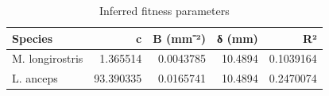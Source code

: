 \documentclass[]{article}
\newenvironment{Shaded}{\begin{snugshade}}{\end{snugshade}}
\newcommand{\DataTypeTok}[1]{\textcolor[rgb]{0.13,0.29,0.53}{#1}}
\newcommand{\KeywordTok}[1]{\textcolor[rgb]{0.13,0.29,0.53}{\textbf{#1}}}
\newcommand{\NormalTok}[1]{#1}
\newcommand{\OperatorTok}[1]{\textcolor[rgb]{0.81,0.36,0.00}{\textbf{#1}}}
\newcommand{\StringTok}[1]{\textcolor[rgb]{0.31,0.60,0.02}{#1}}
\begin{document}
\begin{Shaded}
\end{Shaded}

\begin{table}[t]

\caption{\label{tab:unnamed-chunk-4}Inferred fitness parameters}
\centering
\begin{tabular}{l|r|r|r|r}
\hline
Species & c & B (mm⁻²) & δ (mm) & R²\\
\hline
M. longirostris & 1.365514 & 0.0043785 & 10.4894 & 0.1039164\\
\hline
L. anceps & 93.390335 & 0.0165741 & 10.4894 & 0.2470074\\
\hline
\end{tabular}
\end{table}
\end{document}
